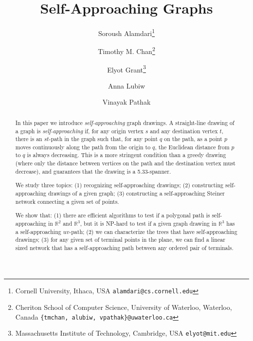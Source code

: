 \documentclass[11pt]{article}
\begin{document}
\title{ Self-Approaching Graphs}

\author{
Soroush Alamdari\thanks{Cornell University, Ithaca, USA {\tt alamdari@cs.cornell.edu}}
\and
Timothy M. Chan\thanks{Cheriton School of Computer Science, University of Waterloo, Waterloo, Canada
    {\tt \{tmchan, alubiw, vpathak\}@uwaterloo.ca}}
\and
Elyot Grant\thanks{Massachusetts Institute of Technology, Cambridge, USA {\tt elyot@mit.edu}}
\and
Anna Lubiw\footnotemark[2]\and
Vinayak Pathak\footnotemark[2]
}



\maketitle


\begin{abstract}
In this paper we introduce \emph{self-approaching}  graph drawings. A straight-line drawing of a graph is \emph{self-approaching} if, for any origin vertex $s$ and any destination vertex $t$, there is an $st$-path in the graph such that,
for any point $q$ on the path,
as a point $p$ moves continuously along the path from the origin to $q$, the  Euclidean distance  from $p$ to $q$ is always decreasing.
This is a more stringent condition than a greedy drawing (where only the distance between vertices on the path and the destination vertex must decrease), and guarantees that the drawing is a 5.33-spanner.

We study three topics:
(1) recognizing self-approaching drawings;
(2) constructing self-approaching drawings of a given graph;
(3) constructing a self-approaching Steiner network connecting a given set of points.

We show that: (1) there are efficient algorithms to test if a polygonal path is self-approaching in $\mathbb{R}^2$ and $\mathbb{R}^3$,
but it is NP-hard to test if a given graph drawing in $\mathbb{R}^3$ has a self-approaching $uv$-path;
(2)
we can characterize the trees that have self-approaching drawings;
(3) for any given set of terminal points in the plane, we can find a linear sized network that has a self-approaching path between any ordered pair of terminals.



\end{abstract}
\end{document}
